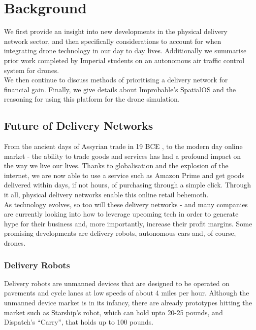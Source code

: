 \documentclass[a4paper,11pt,titlepage]{report}
\begin{document}
\newpage
\chapter{Background}
We first provide an insight into new developments in the physical delivery network sector, and then specifically considerations to account for when integrating drone technology in our day to day lives. Additionally we summarise prior work completed by Imperial students on an autonomous air traffic control system for drones. \\

We then continue to discuss methods of prioritising a delivery network for financial gain. Finally, we give details about Improbable's SpatialOS and the reasoning for using this platform for the drone simulation.

\section{Future of Delivery Networks}
From the ancient days of Assyrian trade in 19 BCE \cite{stearns2001the}, to the modern day online market - the ability to trade goods and services has had a profound impact on the way we live our lives. Thanks to globalisation and the explosion of the internet, we are now able to use a service such as Amazon Prime and get goods delivered within days, if not hours, of purchasing through a simple click. Through it all, physical delivery networks enable this online retail behemoth. \\

As technology evolves, so too will these delivery networks - and many companies are currently looking into how to leverage upcoming tech\cite{Lee2016} in order to generate hype for their business and, more importantly, increase their profit margins. Some promising developments are delivery robots, autonomous cars and, of course, drones.

\subsection{Delivery Robots}
Delivery robots are unmanned devices that are designed to be operated on pavements and cycle lanes at low speeds of about 4 miles per hour\cite{Lee2016}. Although the unmanned device market is in its infancy, there are already prototypes hitting the market such as Starship's robot\cite{Laris2016}, which can hold upto 20-25 pounds, and Dispatch's ``Carry''\cite{Kokalitcheva2016}, that holds up to 100 pounds.
\end{document}
